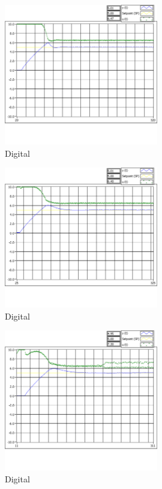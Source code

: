 \documentclass[]{article}
\begin{document}
\begin{figure}[h!]
	\centering
	\includegraphics[width=0.6\textwidth]{Imagenes/DigitalB.png}
	\caption{Digital}
	\label{fig:DigitalB}
\end{figure}


\begin{figure}[h!]
	\centering
	\includegraphics[width=0.6\textwidth]{Imagenes/DigitalC.png}
	\caption{Digital}
	\label{fig:DigitalC}
\end{figure}


\begin{figure}[h!]
	\centering
	\includegraphics[width=0.6\textwidth]{Imagenes/DigitalD.png}
	\caption{Digital}
	\label{fig:DigitalD}
\end{figure}
\end{document}
